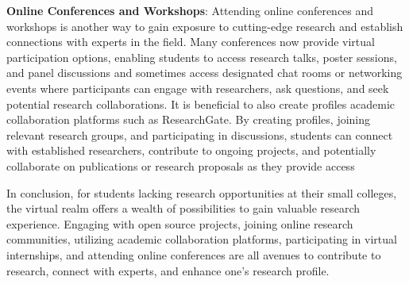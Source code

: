 \documentclass[11pt]{article}
\begin{document}
\textbf{Online Conferences and Workshops}:
Attending online conferences and workshops is another way to gain exposure to cutting-edge research and establish connections with experts in the field. Many conferences now provide virtual participation options, enabling students to access research talks, poster sessions, and panel discussions and sometimes access designated chat rooms or networking events where participants can engage with researchers, ask questions, and seek potential research collaborations. It is beneficial to also create profiles academic collaboration platforms such as ResearchGate. By creating profiles, joining relevant research groups, and participating in discussions, students can connect with established researchers, contribute to ongoing projects, and potentially collaborate on publications or research proposals as they provide access 

In conclusion, for students lacking research opportunities at their small colleges, the virtual realm offers a wealth of possibilities to gain valuable research experience. Engaging with open source projects, joining online research communities, utilizing academic collaboration platforms, participating in virtual internships, and attending online conferences are all avenues to contribute to research, connect with experts, and enhance one's research profile.
\end{document}
